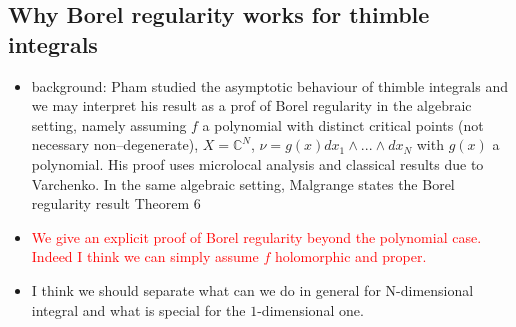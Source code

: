 \documentclass{article}
\theoremstyle{definition}
\newcommand{\C}{\mathbb{C}}
\newcommand*{\defeq}{\mathrel{\vcenter{\baselineskip0.5ex \lineskiplimit0pt
                     \hbox{\scriptsize.}\hbox{\scriptsize.}}}%
                     =}
\begin{document}
\subsection{Why Borel regularity works for thimble integrals}
\color{DarkBlue}
\begin{itemize}
\item background: Pham studied the asymptotic behaviour of thimble integrals and we may interpret his result as a prof of Borel regularity in the algebraic setting, namely assuming $f$ a polynomial with distinct critical points (not necessary non--degenerate), $X=\C^N$, $\nu=g(x)dx_1\wedge...\wedge dx_N$ with $g(x)$ a polynomial. His proof uses microlocal analysis and classical results due to Varchenko. In the same algebraic setting, Malgrange states the Borel regularity result Theorem 6 \cite{Malgrange22} 
\item \textcolor{red}{We give an explicit proof of Borel regularity beyond the polynomial case. Indeed I think we can simply assume $f$ holomorphic and proper.}
\item I think we should separate what can we do in general for N-dimensional integral and what is special for the $1$-dimensional one. 


\end{itemize}
\end{document}
